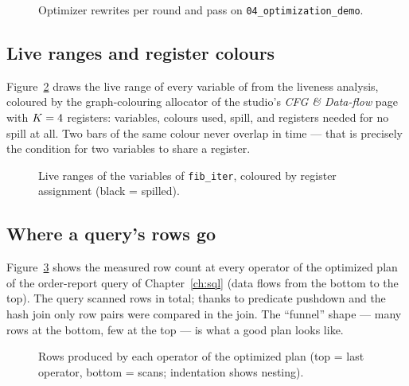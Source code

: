 \begin{figure}[H]\centering

\caption{Optimizer rewrites per round and pass on \texttt{04\_optimization\_demo}.}\label{fig:rounds}
\end{figure}

\subsection{Live ranges and register colours}
Figure~\ref{fig:intervals} draws the live range of every variable of  from the liveness analysis, coloured by the graph-colouring allocator of the studio's \emph{CFG \& Data-flow} page with $K=4$ registers: \VisRaVars{} variables, \VisRaColors{} colours used, \VisRaSpills{} spill, and \VisRaMinK{} registers needed for no spill at all. Two bars of the same colour never overlap in time --- that is precisely the condition for two variables to share a register.

\begin{figure}[H]\centering
\begin{tikzpicture}[x=1cm,y=1cm]

\end{tikzpicture}
\caption{Live ranges of the variables of \texttt{fib\_iter}, coloured by register assignment (black = spilled).}\label{fig:intervals}
\end{figure}

\subsection{Where a query's rows go}
Figure~\ref{fig:sqlrows} shows the measured row count at every operator of the optimized plan of the order-report query of Chapter~\ref{ch:sql} (data flows from the bottom to the top). The query scanned \VisSqlScanned{} rows in total; thanks to predicate pushdown and the hash join only \VisSqlPairs{} row pairs were compared in the join. The ``funnel'' shape --- many rows at the bottom, few at the top --- is what a good plan looks like.

\begin{figure}[H]\centering
\begin{tikzpicture}[x=1cm,y=1cm]

\end{tikzpicture}
\caption{Rows produced by each operator of the optimized plan (top = last operator, bottom = scans; indentation shows nesting).}\label{fig:sqlrows}
\end{figure}


